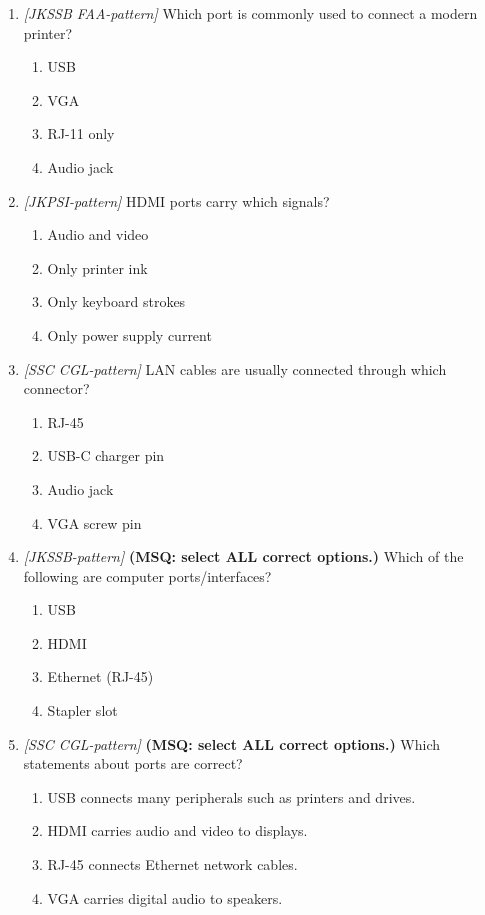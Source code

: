 \documentclass[11pt]{article}
\begin{document}
\begin{enumerate}[label=\textbf{Q\arabic*.}, leftmargin=*]
\item \textit{[JKSSB FAA-pattern]} Which port is commonly used to connect a modern printer?
  \begin{enumerate}[label=\Alph*.]
    \item USB
    \item VGA
    \item RJ-11 only
    \item Audio jack
  \end{enumerate}
\item \textit{[JKPSI-pattern]} HDMI ports carry which signals?
  \begin{enumerate}[label=\Alph*.]
    \item Audio and video
    \item Only printer ink
    \item Only keyboard strokes
    \item Only power supply current
  \end{enumerate}
\item \textit{[SSC CGL-pattern]} LAN cables are usually connected through which connector?
  \begin{enumerate}[label=\Alph*.]
    \item RJ-45
    \item USB-C charger pin
    \item Audio jack
    \item VGA screw pin
  \end{enumerate}
\item \textit{[JKSSB-pattern]} \textbf{(MSQ: select ALL correct options.)} Which of the following are computer ports/interfaces?
  \begin{enumerate}[label=\Alph*.]
    \item USB
    \item HDMI
    \item Ethernet (RJ-45)
    \item Stapler slot
  \end{enumerate}
\item \textit{[SSC CGL-pattern]} \textbf{(MSQ: select ALL correct options.)} Which statements about ports are correct?
  \begin{enumerate}[label=\Alph*.]
    \item USB connects many peripherals such as printers and drives.
    \item HDMI carries audio and video to displays.
    \item RJ-45 connects Ethernet network cables.
    \item VGA carries digital audio to speakers.
  \end{enumerate}
\end{enumerate}
\def\JKSSBLessonID{16}\def\JKSSBAnswers{0}
\end{document}
